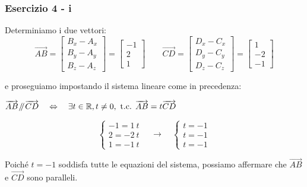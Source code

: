\documentclass{beamer}
\newcommand{\parallelsum}{\mathbin{\!/\mkern-5mu/\!}}
\begin{document}
\begin{frame}
\frametitle{Esercizio 4 - i}
Determiniamo i due vettori:
\begin{displaymath}
\overrightarrow{AB} =  \begin{bmatrix}
                B_x - A_x \\
                B_y - A_y \\
                B_z - A_z 
                \end{bmatrix}
    = \begin{bmatrix}
                -1 \\
                2 \\
                1
                \end{bmatrix}
\qquad
\overrightarrow{CD} =  \begin{bmatrix}
                D_x - C_x \\
                D_y - C_y \\
                D_z - C_z 
                \end{bmatrix}
    = \begin{bmatrix}
                1 \\
                -2 \\
                -1
                \end{bmatrix}
\end{displaymath}

e proseguiamo impostando il sistema lineare come in precedenza:

$\overrightarrow{AB} \parallelsum \overrightarrow{CD} \quad \Leftrightarrow \quad \exists t \in \mathbb R, t\neq 0,\ \text{t.c. } \overrightarrow{AB} = t \overrightarrow{CD}$

\begin{equation*}
  \left\{
 \begin{array}{l}
  -1 = 1\ t \\
  2 = -2\ t \\
  1 = -1\ t
 \end{array}
 \right.
 \quad \rightarrow \quad
  \left\{
 \begin{array}{l}
  t = -1 \\
  t = -1 \\
  t = -1
 \end{array}
 \right.
\end{equation*}
\vspace{0.5cm}

Poich\'e $t=-1$ soddisfa tutte le equazioni del sistema, possiamo affermare che
$\overrightarrow{AB}$ e $\overrightarrow{CD}$ sono paralleli.
\end{frame}
\end{document}

